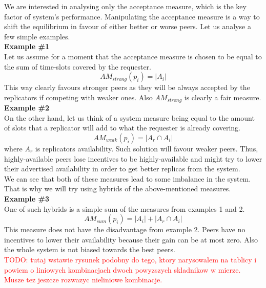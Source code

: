 \documentclass{pracamgren}
\begin{document}
We are interested in analysing only the acceptance measure, which is the key factor of system's performance. Manipulating the acceptance measure is a way to shift the equilibrium in favour of either better or worse peers. Let us analyse a few simple examples.\\


{\bf Example \#1}\\
Let us assume for a moment that the acceptance measure is chosen to be equal to the sum of time-slots covered by the requester.
$$AM_{strong}(p_i) = |A_i|$$
This way clearly favours stronger peers as they will be always accepted by the replicators if competing with weaker ones. Also $AM_{strong}$ is clearly a fair measure.\\

{\bf Example \#2}\\
On the other hand, let us think of a system measure being equal to the amount of slots that a replicator will add to what the requester is already covering.
$$AM_{weak}(p_i) = |A_r \cap A_i|$$
where $A_r$ is replicators availability.
Such solution will favour weaker peers. Thus, highly-available peers lose incentives to be highly-available and might try to lower their advertised availability in order to get better replicas from the system.\\

We can see that both of these measures lead to some imbalance in the system. That is why we will try using hybrids of the above-mentioned measures.\\

{\bf Example \#3}\\
One of such hybrids is a simple sum of the measures from examples 1 and 2.
$$AM_{sum}(p_i) = |A_i| + |A_r \cap A_i|$$
This measure does not have the disadvantage from example 2. Peers have no incentives to lower their availability because their gain can be at most zero. Also the whole system is not biased towards the best peers.\\

\textcolor{red}{TODO: tutaj wstawie rysunek podobny do tego, ktory narysowalem na tablicy i powiem o liniowych kombinacjach dwoch powyzszych skladnikow w mierze. Musze tez jeszcze rozwazyc nieliniowe kombinacje.}\\

\end{document}
